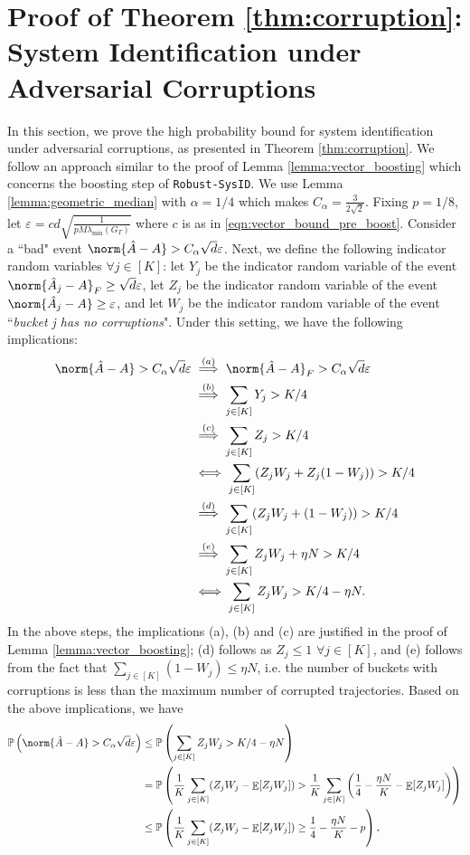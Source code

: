 \documentclass[letterpaper, 11 pt]{article}
\DeclareMathOperator{\E}{\mathbb{E}}
\begin{document}
\section{Proof of Theorem \ref{thm:corruption}: System Identification under Adversarial Corruptions}
In this section, we prove the high probability bound for system identification under adversarial corruptions, as presented in Theorem \ref{thm:corruption}. We follow an approach similar to the proof of Lemma \ref{lemma:vector_boosting} which concerns the boosting step of \texttt{Robust-SysID}. We use Lemma \ref{lemma:geometric_median} with $\alpha = 1/4$ which makes $C_\alpha = \frac{3}{2\sqrt{2}}$. Fixing $p = 1/8$, let $\varepsilon = c d\sqrt{\frac{1}{p M \lambda_{\min}(G_T)}}$ where $c$ is as in \eqref{eqn:vector_bound_pre_boost}. Consider a ``bad" event $\norm{\hat{A} - A} > C_\alpha \sqrt{d}\varepsilon$. Next, we define the following indicator random variables $\forall j \in [K]$: let $Y_j$ be the indicator random variable of the event $\norm{\hat{A}_j - A}_F \geq \sqrt{d}\varepsilon$, let $Z_j$ be the indicator random variable of the event $\norm{\hat{A}_j - A} \geq \varepsilon$, and let $W_j$ be the indicator random variable of the event ``\textit{bucket j has no corruptions}". Under this setting, we have the following implications:
\begin{align*}
    \norm{\hat{A} - A} > C_\alpha\sqrt{d}\varepsilon &\overset{(a)}{\implies} \norm{\hat{A} - A}_F > C_\alpha\sqrt{d}\varepsilon \\
    &\overset{(b)}{\implies} \sum_{j \in [K]} Y_j > K/4 \\
    &\overset{(c)}{\implies} \sum_{j \in [K]} Z_j > K/4 \\
    &\iff \sum_{j \in [K]} (Z_jW_j + Z_j(1 - W_j)) > K/4 \\
    &\overset{(d)}{\implies} \sum_{j \in [K]} (Z_jW_j + (1 - W_j)) > K/4 \\
    &\overset{(e)}{\implies} \sum_{j \in [K]} Z_jW_j + \eta N > K/4 \\
    &\iff \sum_{j \in [K]} Z_jW_j > K/4 - \eta N.
\end{align*}
In the above steps, the implications (a), (b) and (c) are justified in the proof of Lemma \ref{lemma:vector_boosting}; (d) follows as $Z_j \leq 1$ $\forall j \in [K]$, and (e) follows from the fact that $\sum_{j \in [K]} (1 - W_j) \leq \eta N$, i.e. the number of buckets with corruptions is less than the maximum number of corrupted trajectories. Based on the above implications, we have
\begin{align}
    \mathbb{P}\left( \norm{\hat{A} - A} > C_\alpha \sqrt{d}\varepsilon \right) &\leq \mathbb{P} \left( \sum_{j \in [K]}  Z_jW_j > K/4 - \eta N \right) \nonumber\\
    &= \mathbb{P} \left( \frac{1}{K} \sum_{j \in [K]} (Z_jW_j - \E[Z_jW_j]) > \frac{1}{K}\sum_{j \in [K]}\left(\frac{1}{4}  - \frac{\eta N}{K} - \E[Z_jW_j]\right) \right) \nonumber\\
    &\leq \mathbb{P} \left( \frac{1}{K} \sum_{j \in [K]} (Z_jW_j - \E[Z_jW_j]) \geq \frac{1}{4} - \frac{\eta N}{K} - p \right), \label{eqn:corruption_pre_hoeffding}
\end{align}
\end{document}
